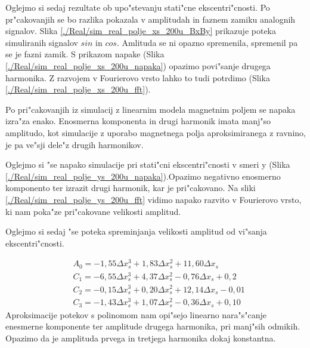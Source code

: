 Oglejmo si sedaj rezultate ob upo"stevanju stati"cne ekscentri"cnosti. Po pr"cakovanjih se bo razlika pokazala v amplitudah in faznem zamiku analognih signalov. Slika \ref{./Real/sim_real_polje_xs_200u_BxBy} prikazuje poteka simuliranih signalov $sin$ in $cos$. Amlituda se ni opazno spremenila, spremenil pa se je fazni zamik.
S prikazom napake (Slika \ref{./Real/sim_real_polje_xs_200u_napaka}) opazimo povi"sanje drugega harmonika. Z razvojem v Fourierovo vrsto lahko to tudi potrdimo (Slika \ref{./Real/sim_real_polje_xs_200u_fft}). 


Po pri"cakovanjih iz simulacij z linearnim modela magnetnim poljem se napaka izra"za enako. Enosmerna komponenta in drugi harmonik imata manj"so amplitudo, kot simulacije z uporabo magnetnega polja aproksimiranega z ravnino, je pa ve"sji dele"z drugih harmonikov.


Oglejmo si "se napako simulacije pri stati"cni ekscentri"cnosti v smeri y (Slika \ref{./Real/sim_real_polje_ys_200u_napaka}).Opazimo negativno enosmerno komponento ter izrazit drugi harmonik, kar je pri"cakovano.  Na sliki \ref{./Real/sim_real_polje_ys_200u_fft} vidimo napako razvito v Fourierovo vrsto, ki nam poka"ze pri"cakovane velikosti amplitud.


\newpage
Oglejmo si sedaj "se poteka spreminjanja velikosti amplitud od vi"sanja ekscentri"cnosti.


\begin{eqnarray}
&A_0=-1,55 \Delta x_s^3+1,83 \Delta x_s^2+11,60 \Delta x_s\\
&C_1=-6,55\Delta x_s^3+4,37 \Delta x_s^2- 0,76\Delta x_s+0,2\\
&C_2=-0,15\Delta x_s^3+0,20\Delta x_s^2+12,14\Delta x_s-0,01\\
&C_3=-1,43\Delta x_s^3+1,07\Delta x_s^2-0,36\Delta x_s +0,10
\end{eqnarray}
Aproksimacije potekov s polinomom nam opi"sejo linearno nara"s"canje enesmerne komponente ter amplitude drugega harmonika, pri manj"sih odmikih.  Opazimo da  je amplituda prvega in tretjega harmonika dokaj konstantna.



